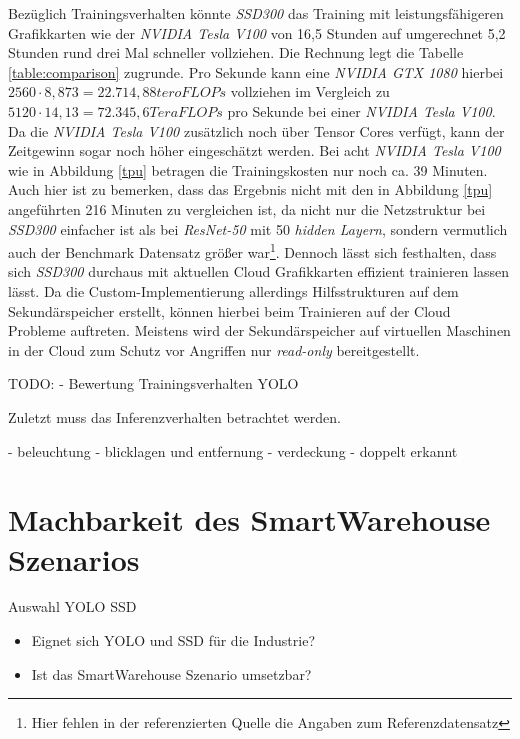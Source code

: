 Bezüglich Trainingsverhalten könnte \textit{SSD300} das Training mit leistungsfähigeren Grafikkarten wie der \textit{NVIDIA Tesla V100} von 16,5 Stunden auf umgerechnet 5,2 Stunden rund drei Mal schneller vollziehen. Die Rechnung legt die Tabelle \ref{table:comparison} zugrunde. Pro Sekunde kann eine \textit{NVIDIA GTX 1080} hierbei $2560 \cdot 8,873 = 22.714,88 teroFLOPs$ vollziehen im Vergleich zu $5120 \cdot 14,13 = 72.345,6 TeraFLOPs$ pro Sekunde bei einer \textit{NVIDIA Tesla V100}. Da die \textit{NVIDIA Tesla V100} zusätzlich noch über Tensor Cores verfügt, kann der Zeitgewinn sogar noch höher eingeschätzt werden. Bei acht \textit{NVIDIA Tesla V100} wie in Abbildung \ref{tpu} betragen die Trainingskosten nur noch ca. 39 Minuten. Auch hier ist zu bemerken, dass das Ergebnis nicht mit den in Abbildung \ref{tpu} angeführten 216 Minuten zu vergleichen ist, da nicht nur die Netzstruktur bei \textit{SSD300} einfacher ist als bei \textit{ResNet-50} mit 50 \textit{hidden Layern}, sondern vermutlich auch der Benchmark Datensatz größer war\footnote{Hier fehlen in der referenzierten Quelle die Angaben zum Referenzdatensatz}. Dennoch lässt sich festhalten, dass sich \textit{SSD300} durchaus mit aktuellen Cloud Grafikkarten effizient trainieren lassen lässt. Da die Custom-Implementierung allerdings Hilfsstrukturen auf dem Sekundärspeicher erstellt, können hierbei beim Trainieren auf der Cloud Probleme auftreten. Meistens wird der Sekundärspeicher auf virtuellen Maschinen in der Cloud zum Schutz vor Angriffen nur \textit{read-only} bereitgestellt. 

TODO:
- Bewertung Trainingsverhalten YOLO

Zuletzt muss das Inferenzverhalten betrachtet werden. 

- beleuchtung
- blicklagen und entfernung
- verdeckung
- doppelt erkannt




\section{Machbarkeit des SmartWarehouse Szenarios}

Auswahl YOLO SSD

\begin{itemize}
	\item Eignet sich YOLO und SSD für die Industrie?
	\item Ist das SmartWarehouse Szenario umsetzbar?
\end{itemize}

